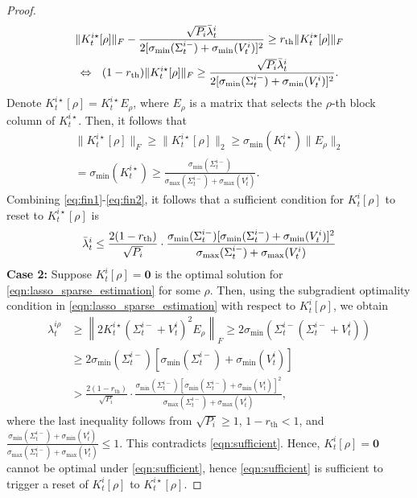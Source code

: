 \documentclass[letterpaper, 10 pt, conference]{ieeeconf}  %
\begin{document}
\begin{proof}
    \begin{multline}\label{eq:fin1}
        \|K_t^{i\star}[\rho]\|_F-\frac{\sqrt{P_i}\Bar{\lambda}_t^i}{2[\sigma_\text{min}(\Sigma_t^{i-})+\sigma_\text{min}(V_t^i)]^2}\geq r_{\text{th}}\|K_t^{i\star}[\rho]\|_F \\       
        \Leftrightarrow\ \  (1-r_{\text{th}})\|K_t^{i\star}[\rho]\|_F\ge\frac{\sqrt{P_i}\Bar{\lambda}_t^i}{2[\sigma_\text{min}(\Sigma_t^{i-})+\sigma_\text{min}(V_t^i)]^2}.
    \end{multline}
    Denote $K_t^{i\star}[\rho]=K_t^{i\star}E_\rho$, where $E_\rho$ is a matrix that selects the $\rho$-th block column of $K_t^{i\star}$. Then, it follows that
    \begin{multline}\label{eq:fin2}
        \|K_t^{i\star}[\rho]\|_F\geq\|K_t^{i\star}[\rho]\|_2\geq\sigma_\text{min}(K_t^{i\star})\|E_\rho\|_2\\= \sigma_\text{min}(K_t^{i\star})\geq\frac{\sigma_\text{min}(\Sigma_t^{i-})}{\sigma_\text{max}(\Sigma_t^{i-})+\sigma_\text{max}(V_t^i)}.
    \end{multline}
    Combining \eqref{eq:fin1}-\eqref{eq:fin2}, it follows that a sufficient condition for $K_t^{i}[\rho]$ to reset to $K_t^{i\star}[\rho]$ is
    \begin{equation}
        \Bar{\lambda}_t^i\leq \frac{2(1-r_{\text{th}})}{\sqrt{P_i}}\cdot\frac{\sigma_\text{min}(\Sigma_t^{i-})[\sigma_\text{min}(\Sigma_t^{i-})+\sigma_\text{min}(V_t^i)]^2}{\sigma_\text{max}(\Sigma_t^{i-})+\sigma_\text{max}(V_t^i)}\label{eqn:sufficient}
    \end{equation}
    \textbf{Case 2:} Suppose $K_t^i[\rho]=\textbf{0}$ is the optimal solution for \eqref{eqn:lasso_sparse_estimation} for some $\rho$. Then, using the subgradient optimality condition in \eqref{eqn:lasso_sparse_estimation} with respect to $K_t^i[\rho]$, we obtain
\begin{equation}
    \begin{aligned}
        \lambda_t^{i\rho}&\geq\left\|2K_t^{i\star}(\Sigma_t^{i-}+V_t^i)^2E_\rho\right\|_F\geq 2\sigma_\text{min}\!\left(\Sigma_t^{i-}(\Sigma_t^{i-}+V_t^i)\right)\\
        &\geq 2\sigma_\text{min}(\Sigma_t^{i-})\left[\sigma_\text{min}(\Sigma_t^{i-})+\sigma_\text{min}(V_t^i)\right]\\
        &> \frac{2(1-r_{\text{th}})}{\sqrt{P_i}}\cdot\frac{\sigma_\text{min}(\Sigma_t^{i-})\left[\sigma_\text{min}(\Sigma_t^{i-})+\sigma_\text{min}(V_t^i)\right]^2}{\sigma_\text{max}(\Sigma_t^{i-})+\sigma_\text{max}(V_t^i)},
    \end{aligned}
    \label{eqn:k=0}
\end{equation}
    where the last inequality follows from $\sqrt{P_i}\geq 1$, $1-r_{\text{th}}<1$, and $\frac{\sigma_\text{min}(\Sigma_t^{i-})+\sigma_\text{min}(V_t^i)}{\sigma_\text{max}(\Sigma_t^{i-})+\sigma_\text{max}(V_t^i)}\leq 1$. This contradicts \eqref{eqn:sufficient}. Hence, $K_t^i[\rho]=\textbf{0}$ cannot be optimal under \eqref{eqn:sufficient}, hence \eqref{eqn:sufficient} is sufficient to trigger a reset of $K_t^i[\rho]$ to $K_t^{i\star}[\rho]$.
\end{proof}
\end{document}
